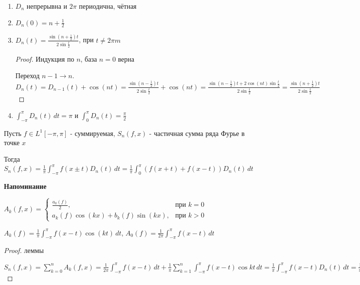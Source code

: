 \begin{properties}
    \begin{enumerate}
        \item $D_n$ непрерывна и $2\pi$ периодична, чётная
        \item $D_n (0) = n + \frac{1}{2}$
        \item {
            $D_n (t) = \frac{\sin (n + \frac{1}{2})t}{2\sin \frac{t}{2}}$, при $t \neq 2\pi m$

            \begin{proof}
                Индукция по $n$, база $n = 0$ верна

                Переход $n - 1 \to n$. $D_{n} (t) = D_{n - 1} (t) + \cos (nt) = \frac{\sin (n - \frac{1}{2})t}{2\sin \frac{t}{2}} + \cos (nt) = \frac{\sin (n - \frac{1}{2})t + 2\cos (nt) \sin \frac{t}{2}}{2\sin \frac{t}{2}} = \frac{\sin (n + \frac{1}{2})t}{2\sin \frac{t}{2}}$
            \end{proof}
        }
        \item $\int_{-\pi}^\pi D_n (t) \, dt = \pi$ и $\int_0^\pi D_n (t) = \frac{\pi}{2}$
    \end{enumerate}
\end{properties}

\begin{lemma}
    Пусть $f \in L^1 [-\pi, \pi]$ - суммируемая, $S_n (f, x)$ - частичная сумма ряда Фурье в точке $x$

    Тогда $S_n (f, x) = \frac{1}{\pi} \int_{-\pi}^\pi f(x \pm t) D_n (t) \, dt = \frac{1}{\pi} \int_0^\pi (f(x + t) + f(x - t)) D_n (t) \, dt$
\end{lemma}

\textbf{Напоминание}

$A_k (f, x) =
\begin{cases}
    \frac{a_0 (f)}{2}, & \text{при $k = 0$} \\
    a_k (f) \cos (kx) + b_k (f) \sin (kx), & \text{при $k > 0$}
\end{cases}$

$A_k (f) = \frac{1}{\pi} \int_{-\pi}^\pi f(x - t) \cos (kt) \, dt$, $A_0 (f) = \frac{1}{2\pi} \int_{-\pi}^\pi f(x - t) \, dt$

\begin{proof}
    леммы

    $S_n (f, x) = \sum_{k = 0}^n A_k (f, x) = \frac{1}{2\pi} \int_{-\pi}^\pi f(x - t) \, dt +  \frac{1}{\pi} \sum_{k = 1}^{n} \int_{-\pi}^\pi f(x - t) \cos kt \, dt =
    \frac{1}{\pi} \int_{-\pi}^\pi f(x - t) D_n (t) \, dt = \frac{1}{\pi} \int_{-\pi}^\pi f(x + u) D_n (u) (-1) \, du$
\end{proof}

